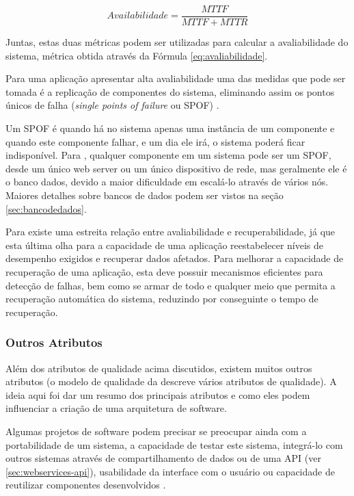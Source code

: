 \documentclass[diss]{template/setrem}
\begin{document}
\begin{equation}
\label{eq:avaliabilidade}
Availabilidade = \frac{MTTF}{MTTF + MTTR}
\end{equation}

Juntas, estas duas métricas podem ser utilizadas para calcular a avaliabilidade do sistema, métrica obtida através da Fórmula \ref{eq:avaliabilidade}.

Para uma aplicação apresentar alta avaliabilidade uma das medidas que pode ser tomada é a replicação de componentes do sistema, eliminando assim os pontos únicos de falha (\emph{single points of failure} ou SPOF) \citep{Gorton2011}.

Um SPOF é quando há no sistema apenas uma instância de um componente e quando este componente falhar, e um dia ele irá, o sistema poderá ficar indisponível. Para \citet{Abbott2011}, qualquer componente em um sistema pode ser um SPOF, desde um único web server ou um único dispositivo de rede, mas geralmente ele é o banco dados, devido a maior dificuldade em escalá-lo através de vários nós. Maiores detalhes sobre bancos de dados podem ser vistos na seção \ref{sec:bancodedados}.

Para \citet{Gorton2011} existe uma estreita relação entre avaliabilidade e recuperabilidade, já que esta última olha para a capacidade de uma aplicação reestabelecer níveis de desempenho exigidos e recuperar dados afetados. Para melhorar a capacidade de recuperação de uma aplicação, esta deve possuir mecanismos eficientes para detecção de falhas, bem como se armar de todo e qualquer meio que permita a recuperação automática do sistema, reduzindo por conseguinte o tempo de recuperação.

\subsubsection{Outros Atributos}
Além dos atributos de qualidade acima discutidos, existem muitos outros atributos (o modelo de qualidade da \citet{Abnt2003} descreve vários atributos de qualidade). A ideia aqui foi dar um resumo dos principais atributos e como eles podem influenciar a criação de uma arquitetura de software.

Algumas projetos de software podem precisar se preocupar ainda com a portabilidade de um sistema, a capacidade de testar este sistema, integrá-lo com outros sistemas através de compartilhamento de dados ou de uma API (ver \ref{sec:webservices-api}), usabilidade da interface com o usuário ou capacidade de reutilizar componentes desenvolvidos \citep{Gorton2011}.
\end{document}

